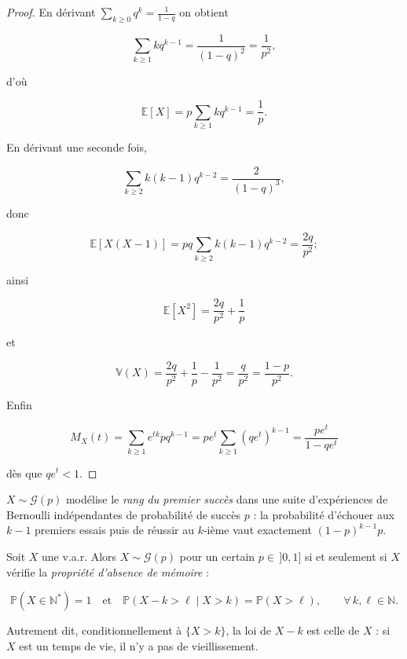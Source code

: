 \begin{proof}
En dérivant $\sum_{k\ge0}q^k=\frac1{1-q}$ on obtient

$$
\sum_{k\ge1}kq^{k-1}=\frac1{(1-q)^2}=\frac1{p^2},
$$ 

d'où

$$
\mathbb{E}[X]=p\sum_{k\ge1}kq^{k-1}=\frac1p.
$$ 

En dérivant une seconde fois,

$$
\sum_{k\ge2}k(k-1)q^{k-2}=\frac2{(1-q)^3},
$$ 

donc

$$
\mathbb{E}[X(X-1)]=pq\sum_{k\ge2}k(k-1)q^{k-2}=\frac{2q}{p^2};
$$ 

ainsi

$$
\mathbb{E}[X^2]=\frac{2q}{p^2}+\frac1p
$$ 

et

$$
\mathbb{V}(X)=\frac{2q}{p^2}+\frac1p-\frac1{p^2}=\frac{q}{p^2}=\frac{1-p}{p^2}.
$$

Enfin 

$$
M_X(t)=\sum_{k\ge1}e^{tk}pq^{k-1}=pe^t\sum_{k\ge1}(qe^t)^{k-1}
=\frac{pe^t}{1-qe^t}
$$ 

dès que $qe^t<1$.
\end{proof}

\begin{remarque}[Interprétation]
$X\sim\mathcal{G}(p)$ modélise le \emph{rang du premier succès} dans une suite d'expériences de Bernoulli indépendantes de probabilité de succès $p$ : la probabilité d'échouer aux $k-1$ premiers essais puis de réussir au $k$-ième vaut exactement $(1-p)^{k-1}p$.
\end{remarque}

\medskip

\begin{mdframed}
\begin{proposition}
Soit $X$ une v.a.r. Alors $X\sim\mathcal{G}(p)$ pour un certain $p\in\,]0,1]$ si et seulement si $X$ vérifie la \emph{propriété d'absence de mémoire} :

$$
  \mathbb{P}(X\in\mathbb{N}^*)=1
  \quad\text{et}\quad
  \mathbb{P}(X-k>\ell\mid X>k)=\mathbb{P}(X>\ell),\qquad \forall\,k,\ell\in\mathbb{N}.
$$

Autrement dit, conditionnellement à $\{X>k\}$, la loi de $X-k$ est celle de $X$ : si $X$ est un temps de vie, il n'y a pas de vieillissement.
\end{proposition}
\end{mdframed}

